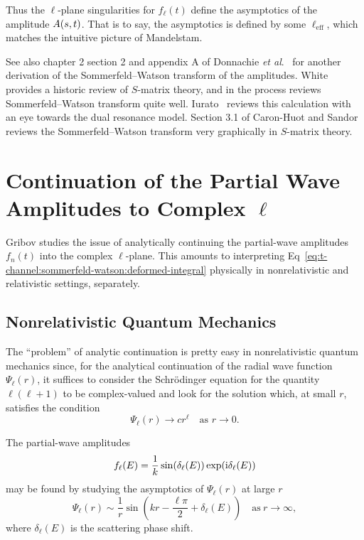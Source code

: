 Thus the $\ell$-plane singularities for $f_{\ell}(t)$ define the
asymptotics of the amplitude $A(s,t)$. That is to say, the
asymptotics is defined by some $\ell_{\text{eff}}$, which matches the
intuitive picture of Mandelstam.

See also chapter 2 section 2 and appendix A of Donnachie \textit{et al}.~\cite{Donnachie:2002en}
for another derivation of the Sommerfeld--Watson transform of the amplitudes.
White~\cite{White:2000zs} provides a historic review of $S$-matrix
theory, and in the process reviews Sommerfeld--Watson transform quite
well. Iurato~\cite{Iurato:2015} reviews this calculation with an eye
towards the dual resonance model. Section 3.1 of Caron-Huot and Sandor~\cite{Caron-Huot:2020nem}
reviews the Sommerfeld--Watson transform very graphically in $S$-matrix theory.

\section{Continuation of the Partial Wave Amplitudes to Complex \texorpdfstring{$\ell$}{l}}

\M Gribov studies the issue of analytically continuing the partial-wave
amplitudes $f_{n}(t)$ into the complex $\ell$-plane. This amounts to
interpreting Eq~\eqref{eq:t-channel:sommerfeld-watson:deformed-integral}
physically in nonrelativistic and relativistic settings, separately.

\subsection{Nonrelativistic Quantum Mechanics}

\M
The ``problem'' of analytic continuation is pretty easy in
nonrelativistic quantum mechanics since, for the analytical continuation
of the radial wave function $\Psi_{\ell}(r)$, it suffices to consider
the Schr\"{o}dinger equation for the quantity $\ell(\ell+1)$ to be
complex-valued and look for the solution which, at small $r$, satisfies
the condition
\begin{equation}
\Psi_{\ell}(r)\to cr^{\ell}\quad\mbox{as }r\to 0.
\end{equation}

\M
The partial-wave amplitudes
\begin{equation}
f_{\ell}(E) = \frac{1}{k}\sin(\delta_{\ell}(E))\exp(\mathrm{i}\delta_{\ell}(E))
\end{equation}
may be found by studying the asymptotics of $\Psi_{\ell}(r)$ at large
$r$
\begin{equation}
\Psi_{\ell}(r)\sim\frac{1}{r}\sin\left(kr - \frac{\ell\pi}{2}+\delta_{\ell}(E)\right)\quad\mbox{as}~r\to\infty,
\end{equation}
where $\delta_{\ell}(E)$ is the scattering phase shift.


